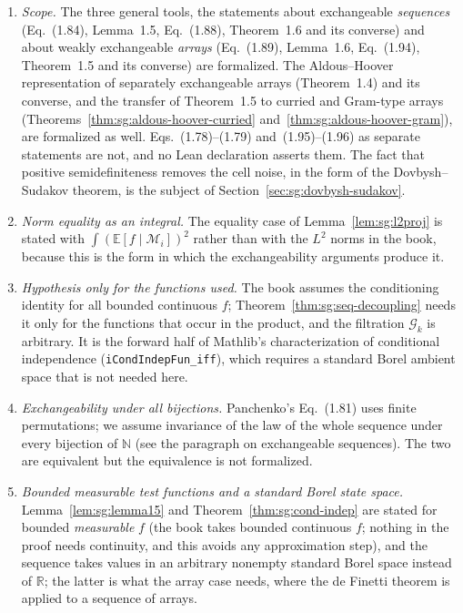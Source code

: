 \begin{remark}\label{rem:sg:aldous-hoover-deviation}
\begin{enumerate}
\item \emph{Scope.} The three general tools, the statements about exchangeable \emph{sequences} (Eq.~(1.84), Lemma~1.5, Eq.~(1.88), Theorem~1.6 and its converse) and about weakly exchangeable \emph{arrays} (Eq.~(1.89), Lemma~1.6, Eq.~(1.94), Theorem~1.5 and its converse) are formalized. The Aldous--Hoover representation of separately exchangeable arrays (Theorem~1.4) and its converse, and the transfer of Theorem~1.5 to curried and Gram-type arrays (Theorems~\ref{thm:sg:aldous-hoover-curried} and~\ref{thm:sg:aldous-hoover-gram}), are formalized as well. Eqs.~(1.78)--(1.79) and~(1.95)--(1.96) as separate statements are not, and no Lean declaration asserts them. The fact that positive semidefiniteness removes the cell noise, in the form of the Dovbysh--Sudakov theorem, is the subject of Section~\ref{sec:sg:dovbysh-sudakov}.
\item \emph{Norm equality as an integral.} The equality case of Lemma~\ref{lem:sg:l2proj} is stated with $\int(\mathbb E[f\mid\mathscr M_i])^2$ rather than with the $L^2$ norms in the book, because this is the form in which the exchangeability arguments produce it.
\item \emph{Hypothesis only for the functions used.} The book assumes the conditioning identity for all bounded continuous $f$; Theorem~\ref{thm:sg:seq-decoupling} needs it only for the functions that occur in the product, and the filtration $\mathscr G_k$ is arbitrary.
It is the forward half of Mathlib's characterization of conditional independence (\texttt{iCondIndepFun\_iff}), which requires a standard Borel ambient space that is not needed here.
\item \emph{Exchangeability under all bijections.} Panchenko's Eq.~(1.81) uses finite permutations; we assume invariance of the law of the whole sequence under every bijection of $\mathbb N$ (see the paragraph on exchangeable sequences). The two are equivalent but the equivalence is not formalized.
\item \emph{Bounded measurable test functions and a standard Borel state space.} Lemma~\ref{lem:sg:lemma15} and Theorem~\ref{thm:sg:cond-indep} are stated for bounded \emph{measurable} $f$ (the book takes bounded continuous $f$; nothing in the proof needs continuity, and this avoids any approximation step), and the sequence takes values in an arbitrary nonempty standard Borel space instead of $\mathbb R$; the latter is what the array case needs, where the de Finetti theorem is applied to a sequence of arrays.

\end{enumerate}
\end{remark}
